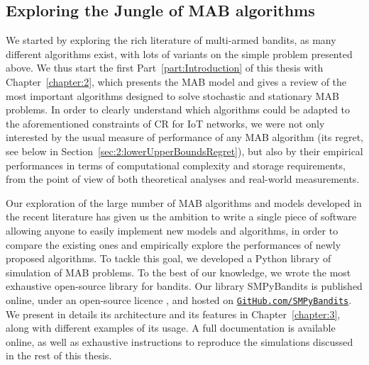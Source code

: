 \subsection{Exploring the Jungle of MAB algorithms}

%
We started by exploring the rich literature of multi-armed bandits,
as many different algorithms exist, with lots of variants on the simple problem presented above.
We thus start the first Part~\ref{part:Introduction} of this thesis with Chapter~\ref{chapter:2}, which presents the MAB model and gives a review of the most important algorithms designed to solve stochastic and stationary MAB problems.
%
In order to clearly understand which algorithms could be adapted to the aforementioned constraints of CR for IoT networks,
we were not only interested by the usual measure of performance of any MAB algorithm (its regret, see below in Section~\ref{sec:2:lowerUpperBoundsRegret}),
but also by their empirical performances in terms of computational complexity and storage requirements, from the point of view of both theoretical analyses and real-world measurements.


%
Our exploration of the large number of MAB algorithms and models developed in the recent literature
has given us the ambition to write a single piece of software allowing anyone to easily implement new models and algorithms, in order to compare the existing ones and empirically explore the performances of newly proposed algorithms.
To tackle this goal, we developed a Python library of simulation of MAB problems.
%
To the best of our knowledge, we wrote the most exhaustive open-source library for bandits. Our library SMPyBandits is published online, under an open-source licence \cite{SMPyBanditsJMLR,SMPyBandits}, and hosted on \href{https://GitHub.com/SMPyBandits}{\texttt{GitHub.com/SMPyBandits}}.
We present in details its architecture and its features in Chapter~\ref{chapter:3}, along with different examples of its usage.
A full documentation is available online, as well as exhaustive instructions to reproduce the simulations discussed in the rest of this thesis.


